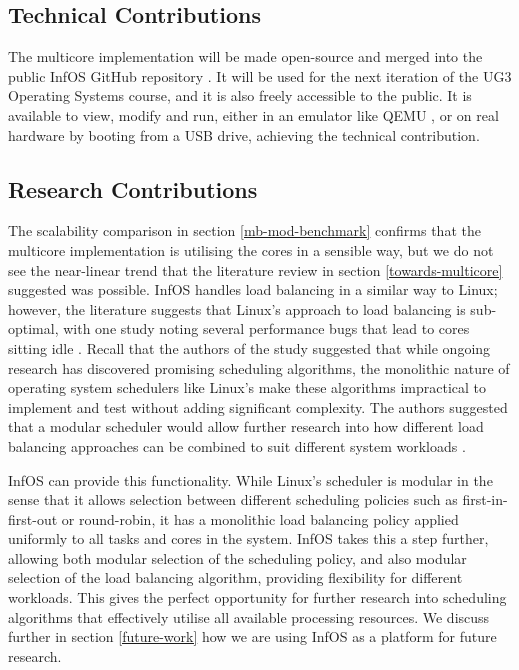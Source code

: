 \documentclass[bsc,frontabs,singlespacing,parskip,deptreport]{infthesis}
\begin{document}
\subsection{Technical Contributions}
The multicore implementation will be made open-source and merged into the public InfOS GitHub repository \cite{infos}. It will be used for the next iteration of the UG3 Operating Systems course, and it is also freely accessible to the public. It is available to view, modify and run, either in an emulator like QEMU \cite{qemu}, or on real hardware by booting from a USB drive, achieving the technical contribution.

\subsection{Research Contributions}
The scalability comparison in section \ref{mb-mod-benchmark} confirms that the multicore implementation is utilising the cores in a sensible way, but we do not see the near-linear trend that the literature review in section \ref{towards-multicore} suggested was possible. InfOS handles load balancing in a similar way to Linux; however, the literature suggests that Linux's approach to load balancing is sub-optimal, with one study noting several performance bugs that lead to cores sitting idle \cite{wasted-cores}. Recall that the authors of the study suggested that  while ongoing research has discovered promising scheduling algorithms, the monolithic nature of operating system schedulers like Linux's make these algorithms impractical to implement and test without adding significant complexity. The authors suggested that a modular scheduler would allow further research into how different load balancing approaches can be combined to suit different system workloads \cite{wasted-cores}.

InfOS can provide this functionality. While Linux's scheduler is modular in the sense that it allows selection between different scheduling policies such as first-in-first-out or round-robin, it has a monolithic load balancing policy applied uniformly to all tasks and cores in the system. InfOS takes this a step further, allowing both modular selection of the scheduling policy, and also modular selection of the load balancing algorithm, providing flexibility for different workloads. This gives the perfect opportunity for further research into scheduling algorithms that effectively utilise all available processing resources. We discuss further in section \ref{future-work} how we are using InfOS as a platform for future research.
\end{document}
